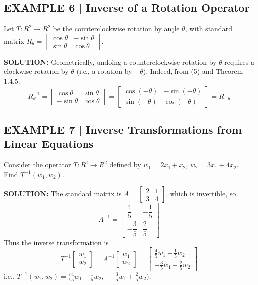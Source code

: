 \documentclass{article}
\theoremstyle{mystyle}
\begin{document}
\subsection*{EXAMPLE 6 | Inverse of a Rotation Operator}
Let $T:R^2\to R^2$ be the counterclockwise rotation by angle $\theta$, with standard matrix $R_\theta=\begin{bmatrix}\cos\theta&-\sin\theta\\\sin\theta&\cos\theta\end{bmatrix}$.

\textbf{SOLUTION:} Geometrically, undoing a counterclockwise rotation by $\theta$ requires a clockwise rotation by $\theta$ (i.e., a rotation by $-\theta$). Indeed, from (5) and Theorem 1.4.5:
\[
R_\theta^{-1}=\begin{bmatrix}\cos\theta&\sin\theta\\-\sin\theta&\cos\theta\end{bmatrix}=\begin{bmatrix}\cos(-\theta)&-\sin(-\theta)\\\sin(-\theta)&\cos(-\theta)\end{bmatrix}=R_{-\theta}
\]

\subsection*{EXAMPLE 7 | Inverse Transformations from Linear Equations}
Consider the operator $T:R^2\to R^2$ defined by $w_1=2x_1+x_2$, $w_2=3x_1+4x_2$. Find $T^{-1}(w_1,w_2)$.

\textbf{SOLUTION:} The standard matrix is $A=\begin{bmatrix}2&1\\3&4\end{bmatrix}$, which is invertible, so
\[
A^{-1}=\begin{bmatrix}\dfrac{4}{5}&-\dfrac{1}{5}\\[6pt]-\dfrac{3}{5}&\dfrac{2}{5}\end{bmatrix}
\]
Thus the inverse transformation is
\[
T^{-1}\!\begin{bmatrix}w_1\\w_2\end{bmatrix}=A^{-1}\begin{bmatrix}w_1\\w_2\end{bmatrix}=\begin{bmatrix}\tfrac45w_1-\tfrac15w_2\\[4pt]-\tfrac35w_1+\tfrac25w_2\end{bmatrix}
\]
i.e., $T^{-1}(w_1,w_2)=\bigl(\tfrac45w_1-\tfrac15w_2,\;-\tfrac35w_1+\tfrac25w_2\bigr)$.
\end{document}
